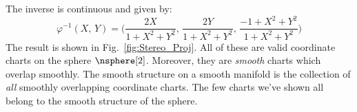 \documentclass{book}                                                           %
\begin{document}
                \hfill
                \par
                The inverse is continuous and given by:
                \begin{equation}
                    \varphi^{\minus{1}}(X,\,Y)=
                    \Big(\frac{2X}{1+X^{2}+Y^{2}},\,
                         \frac{2Y}{1+X^{2}+Y^{2}},\,
                         \frac{\minus{1}+X^{2}+Y^{2}}{1+X^{2}+Y^{2}}\Big)
                \end{equation}
                The result is shown in Fig.~\ref{fig:Stereo_Proj}. All of these
                are valid coordinate charts on the sphere $\nsphere[2]$.
                Moreover, they are \textit{smooth} charts which overlap
                smoothly. The smooth structure on a smooth manifold is the
                collection of \textit{all} smoothly overlapping coordinate
                charts. The few charts we've shown all belong to the smooth
                structure of the sphere.
\end{document}
